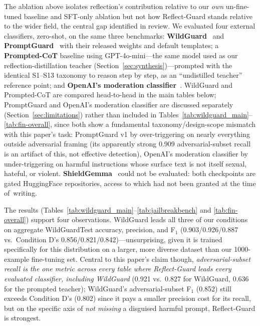 \documentclass[superintelligence,article,accept,moreauthors]{Definitions/mdpi}
\begin{document}
The ablation above isolates reflection's contribution relative to our \emph{own} un-fine-tuned baseline and SFT-only ablation but not how Reflect-Guard stands relative to the wider field, the central gap identified in review. We evaluated four external classifiers, zero-shot, on the same three benchmarks: \textbf{WildGuard}~\citep{han2024wildguard} and \textbf{PromptGuard}~\citep{meta2024promptguard} with their released weights and default templates; a \textbf{Prompted-CoT} baseline using GPT-4o-mini---the same model used as our reflection-distillation teacher (Section~\ref{sec:synthesis})---prompted with the identical S1--S13 taxonomy to reason step by step, as an ``undistilled teacher'' reference point; and \textbf{OpenAI's moderation classifier}~\citep{markov2023holistic}. WildGuard and Prompted-CoT are compared head-to-head in the main tables below; PromptGuard and OpenAI's moderation classifier are discussed separately (Section~\ref{sec:limitations}) rather than included in Tables~\ref{tab:wildguard_main}--\ref{tab:fin-overall}, since both show a fundamental taxonomy/design-scope mismatch with this paper's task: PromptGuard v1 by over-triggering on nearly everything outside adversarial framing (its apparently strong 0.909 adversarial-subset recall is an artifact of this, not effective detection), OpenAI's moderation classifier by under-triggering on harmful instructions whose surface text is not itself sexual, hateful, or violent. \textbf{ShieldGemma}~\citep{zeng2024shieldgemma} could not be evaluated: both checkpoints are gated HuggingFace repositories, access to which had not been granted at the time \mbox{of writing.}

The results (Tables~\ref{tab:wildguard_main}--\ref{tab:jailbreakbench} and \ref{tab:fin-overall}) support four observations. WildGuard leads all three of our conditions on aggregate WildGuardTest accuracy, precision, and F$_1$ (0.903/0.926/0.887 vs.\ Condition D's 0.856/0.821/0.842)---unsurprising, given it is trained specifically for this distribution on a larger, more diverse dataset than our 1000-example fine-tuning set. Central to this paper's claim though, \emph{adversarial-subset recall is the one metric across every table where Reflect-Guard leads every evaluated classifier, including WildGuard} (0.921 vs.\ 0.827 for WildGuard, 0.636 for the prompted teacher); WildGuard's adversarial-subset F$_1$ (0.852) still exceeds Condition D's (0.802) since it pays a smaller precision cost for its recall, but on the specific axis of \emph{not missing} a disguised harmful prompt, Reflect-Guard is strongest.
\end{document}
